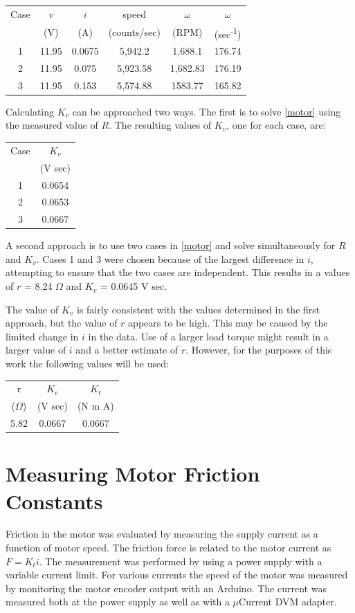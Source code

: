 \documentclass[12pt,letterpaper]{article}
\begin{document}
\begin{appendices}
\begin{tabular}{|c|c|c|c|c|c|}
\hline
Case & $v$ & $i$ & speed & $\omega$ & $\omega$ \\
      & (V) &  (A) & (counts/sec) & (RPM) & (sec\textsuperscript{-1}) \\
\hline
1    & 11.95 & 0.0675 & 5,942.2   & 1,688.1   & 176.74 \\
2    & 11.95 & 0.075   & 5,923.58 & 1,682.83 & 176.19 \\ 
3    & 11.95 & 0.153   & 5,574.88 & 1583.77  & 165.82 \\
\hline
\end{tabular}

Calculating $K_{v}$ can be approached two ways.  The first is to solve \eqref{motor} using the measured
value of $R$.  The resulting values of $K_{v}$, one for each case, are:

\begin{tabular}{|c|c|}
\hline
Case & $K_{v}$  \\
         & (V sec) \\
\hline
1    & 0.0654  \\
2    & 0.0653  \\
3    & 0.0667  \\
\hline
\end{tabular}

A second approach is to use two cases in \eqref{motor} and solve simultaneously for $R$ and $K_{v}$.
Cases 1 and 3 were chosen because of the largest difference in $i$, attempting to ensure that the two
cases are independent.  This results in a values of $r$ = 8.24 $\Omega$ and $K_{v}$ = 0.0645 V sec.

The value of $K_{v}$ is fairly consistent with the values determined in the first approach, but the value
of $r$ appears to be high.  This may be caused by the limited change in $i$ in the data.  Use of a larger
load torque might result in a larger value of $i$ and a better estimate of $r$.  However, for the purposes
of this work the following values will be used:

\begin{tabular}{|c|c|c|}
\hline
r                   & $K_{v}$  & $K_{t}$ \\
($\Omega$)   & (V sec)   & (N m A) \\
\hline
5.82    & 0.0667  & 0.0667  \\
\hline
\end{tabular}

\section{Measuring Motor Friction Constants}
\label{appendix:friction}
Friction in the motor was evaluated by measuring the supply current as a function of motor speed.
The friction force is related to the motor current as $F = K_{t} i$.  The measurement was performed
by using a power supply with a variable current limit.  For various currents the speed of the motor
was measured by monitoring the motor encoder output with an Arduino.  The current was measured
both at the power supply as well as with a $\mu$Current DVM adapter.


\end{appendices}
\end{document}

